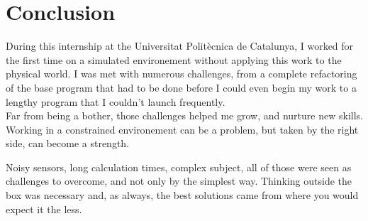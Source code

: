 \chapter{Conclusion}

\label{conclusion}

During this internship at the Universitat Politècnica de Catalunya, I worked for the first time on a simulated environement without applying this work to the physical world.
I was met with numerous challenges, from a complete refactoring of the base program that had to be done before I could even begin my work to a lengthy program that I couldn't launch frequently.\\

Far from being a bother, those challenges helped me grow, and nurture new skills. Working in a constrained environement can be a problem, but taken by the right side, can become a strength.

Noisy sensors, long calculation times, complex subject, all of those were seen as challenges to overcome, and not only by the simplest way.
Thinking outside the box was necessary and, as always, the best solutions came from where you would expect it the less.
